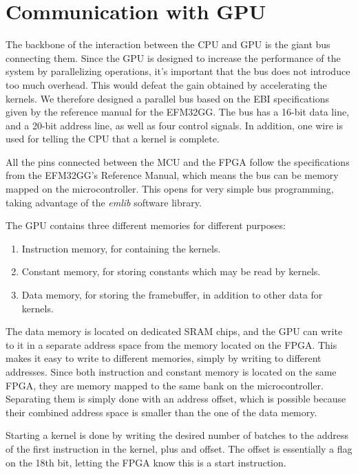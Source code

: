 \section{Communication with GPU}

The backbone of the interaction between the CPU and GPU is the giant bus connecting them.
Since the GPU is designed to increase the performance of the system by parallelizing operations,
it's important that the bus does not introduce too much overhead.
This would defeat the gain obtained by accelerating the kernels.
We therefore designed a parallel bus based on the EBI specifications given
by the reference manual for the EFM32GG.
The bus has a 16-bit data line, and a 20-bit address line, as well as four control signals.
In addition, one wire is used for telling the CPU that a kernel is complete.

All the pins connected between the MCU and the FPGA follow the specifications from the EFM32GG's Reference Manual\cite[p.175]{efm32gg},
which means the bus can be memory mapped on the microcontroller.
This opens for very simple bus programming, taking advantage of the \textit{emlib} software library.

The GPU contains three different memories for different purposes:

\begin{enumerate}
    \item Instruction memory, for containing the kernels.
    \item Constant memory, for storing constants which may be read by kernels.
    \item Data memory, for storing the framebuffer, in addition to other data for kernels.
\end{enumerate}

The data memory is located on dedicated SRAM chips,
and the GPU can write to it in a separate address space from the memory located on the FPGA.
This makes it easy to write to different memories, simply by writing to different addresses.
Since both instruction and constant memory is located on the same FPGA,
they are memory mapped to the same bank on the microcontroller.
Separating them is simply done with an address offset,
which is possible because their combined address space is smaller than the one of the data memory.

Starting a kernel is done by writing the desired number of batches
 to the address of the first instruction in the kernel, plus and offset.
The offset is essentially a flag on the 18th bit, letting the FPGA know this is a start instruction.
